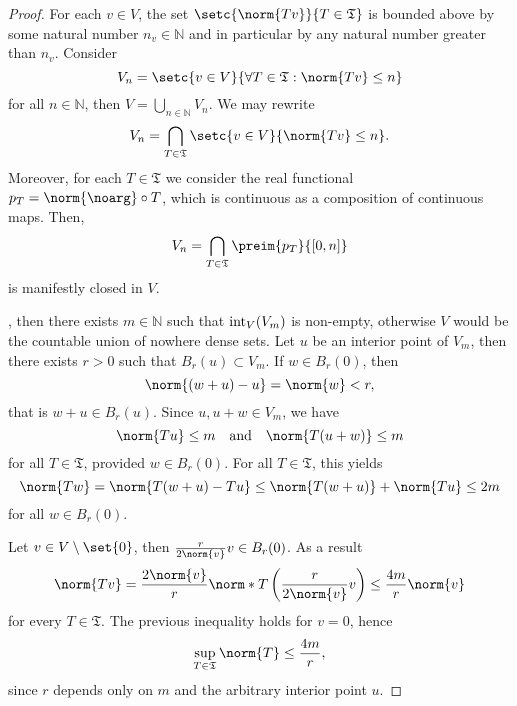 \begin{proof}
    For each \(v \in V\), the set \(\setc{\norm{Tv}}{T \in \mathfrak{T}}\) is bounded above by some natural number \(n_v \in \mathbb{N}\) and in particular by any natural number greater than \(n_v\). Consider
    \begin{equation*}
        V_n = \setc{v \in V}{\forall T \in \mathfrak{T} : \norm{Tv} \leq n}
    \end{equation*}
    for all \(n \in \mathbb{N}\), then \(V = \bigcup_{n \in \mathbb{N}} V_n\). We may rewrite
    \begin{equation*}
        V_n = \bigcap_{T \in \mathfrak{T}} \setc{v \in V}{\norm{Tv}\leq n}.
    \end{equation*}
    Moreover, for each \(T \in \mathfrak{T}\) we consider the real functional \(p_T = \norm{\noarg} \circ T\), which is continuous as a composition of continuous maps. Then,
    \begin{equation*}
        V_n = \bigcap_{T \in \mathfrak{T}} \preim{p_T}{[0,n]}
    \end{equation*}
    is manifestly closed in \(V\).

    , then there exists \(m \in \mathbb{N}\) such that \(\operatorname{int}_V(V_m)\) is non-empty, otherwise \(V\) would be the countable union of nowhere dense sets. Let \(u\) be an interior point of \(V_m\), then there exists \(r > 0\) such that \(B_r(u) \subset V_m\). If \(w \in B_r(0)\), then
    \begin{equation*}
        \norm{(w + u) - u} = \norm{w} < r,
    \end{equation*}
    that is \(w + u \in B_r(u)\). Since \(u, u + w \in V_m\), we have
    \begin{equation*}
        \norm{Tu} \leq m
        \quad\text{and}{\quad}
        \norm{T(u + w)} \leq m
    \end{equation*}
    for all \(T \in \mathfrak{T}\), provided \(w \in B_r(0)\). For all \(T \in \mathfrak{T}\), this yields
    \begin{equation*}
        \norm{Tw} = \norm{T(w + u) - Tu} \leq \norm{T(w + u)} + \norm{Tu} \leq 2m
    \end{equation*}
    for all \(w \in B_r(0)\).

    Let \(v \in V\setminus\set{0}\), then \(\frac{r}{2\norm{v}}v \in B_r(0)\). As a result
    \begin{equation*}
        \norm{Tv} = \frac{2\norm{v}}{r}\norm*{T\left(\frac{r}{2\norm{v}}v\right)} \leq \frac{4m}{r}\norm{v}
    \end{equation*}
    for every \(T \in \mathfrak{T}\). The previous inequality holds for \(v = 0\), hence
    \begin{equation*}
        \sup_{T \in \mathfrak{T}} \norm{T} \leq \frac{4m}{r},
    \end{equation*}
    since \(r\) depends only on \(m\) and the arbitrary interior point \(u\).
\end{proof}

